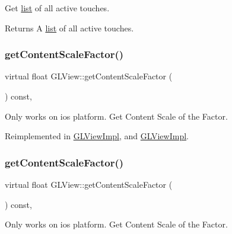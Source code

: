 Get \hyperlink{protocollist-p}{list} of all active touches.

\begin{DoxyReturn}{Returns}
A \hyperlink{protocollist-p}{list} of all active touches. 
\end{DoxyReturn}
\mbox{\label{classGLView_a730b2ced5ee33d2bf975eb3fffd317bf}} 
\subsubsection{\texorpdfstring{get\+Content\+Scale\+Factor()}{getContentScaleFactor()}\hspace{0.1cm}{\footnotesize\ttfamily [1/2]}}
{\footnotesize\ttfamily virtual float G\+L\+View\+::get\+Content\+Scale\+Factor (\begin{DoxyParamCaption}{ }\end{DoxyParamCaption}) const\hspace{0.3cm}{\ttfamily [inline]}, {\ttfamily [virtual]}}

Only works on ios platform. Get Content Scale of the Factor. 

Reimplemented in \hyperlink{classGLViewImpl_a475f5c382360141199bf110655941a22}{G\+L\+View\+Impl}, and \hyperlink{classGLViewImpl_a507c696f2d69451ca36ff787a996bf22}{G\+L\+View\+Impl}.

\mbox{\label{classGLView_a730b2ced5ee33d2bf975eb3fffd317bf}} 
\subsubsection{\texorpdfstring{get\+Content\+Scale\+Factor()}{getContentScaleFactor()}\hspace{0.1cm}{\footnotesize\ttfamily [2/2]}}
{\footnotesize\ttfamily virtual float G\+L\+View\+::get\+Content\+Scale\+Factor (\begin{DoxyParamCaption}{ }\end{DoxyParamCaption}) const\hspace{0.3cm}{\ttfamily [inline]}, {\ttfamily [virtual]}}

Only works on ios platform. Get Content Scale of the Factor. 

